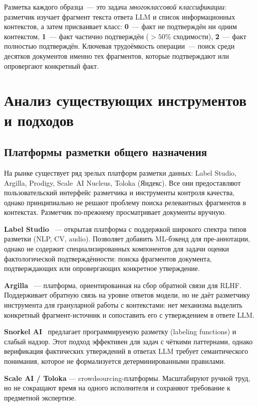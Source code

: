 \documentclass[times]{itmo-student-thesis}
\begin{document}
Разметка каждого образца~--- это задача \emph{многоклассовой классификации}:
разметчик изучает фрагмент текста ответа LLM и список информационных
контекстов, а затем присваивает класс:
\textbf{0}~--- факт не подтверждён ни одним контекстом,
\textbf{1}~--- факт частично подтверждён ($>50\%$ сходимости),
\textbf{2}~--- факт полностью подтверждён.
Ключевая трудоёмкость операции~--- поиск среди десятков документов именно тех
фрагментов, которые подтверждают или опровергают конкретный факт.

\section{Анализ существующих инструментов и подходов}

\subsection{Платформы разметки общего назначения}

На рынке существует ряд зрелых платформ разметки данных: Label Studio,
Argilla, Prodigy, Scale~AI Nucleus, Toloka (Яндекс). Все они предоставляют
пользовательский интерфейс разметчика и инструменты контроля качества,
однако принципиально не решают проблему поиска релевантных фрагментов
в контекстах. Разметчик по-прежнему просматривает документы вручную.

\textbf{Label Studio}~\cite{labelstudio} — открытая платформа с поддержкой
широкого спектра типов разметки (NLP, CV, audio). Позволяет добавить
ML-бэкенд для пре-аннотации, однако не содержит специализированных
компонентов для задачи оценки фактологической подтверждённости: поиска фрагментов документа,
подтверждающих или опровергающих конкретное утверждение.

\textbf{Argilla}~\cite{argilla} — платформа, ориентированная на сбор
обратной связи для RLHF. Поддерживает обратную связь на уровне ответов
модели, но не даёт разметчику инструмента для грануларной работы
с контекстами: нет механизма выделить конкретный фрагмент-источник
и сопоставить его с утверждением в ответе LLM.

\textbf{Snorkel AI}~\cite{snorkel} предлагает программируемую разметку
(labeling functions) и слабый надзор. Этот подход эффективен для задач
с чёткими паттернами, однако верификация фактических утверждений
в ответах LLM требует семантического понимания, которое не формализуется
детерминированными правилами.

\textbf{Scale AI / Toloka} — crowdsourcing-платформы. Масштабируют ручной
труд, но не сокращают время на одного исполнителя и сохраняют требование
к предметной экспертизе.
\end{document}
